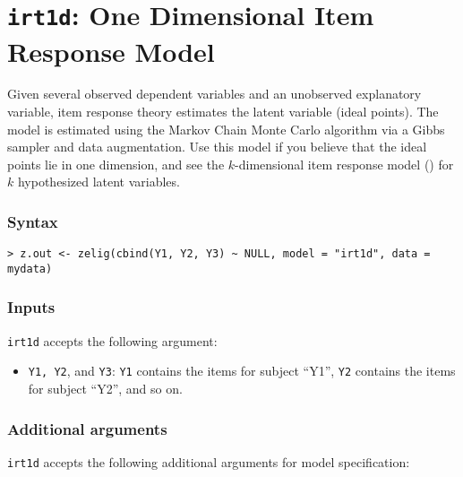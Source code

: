 \section{\texttt{irt1d}: One Dimensional Item Response Model}

\label{irt1d}

Given several observed dependent variables and an unobserved
explanatory variable, item response theory estimates the latent
variable (ideal points).  The model is estimated using the Markov
Chain Monte Carlo algorithm via a Gibbs sampler and data augmentation.
Use this model if you believe that the ideal points lie in one
dimension, and see the $k$-dimensional item response model
() for $k$ hypothesized latent variables.

\subsubsection{Syntax}
\begin{verbatim}
> z.out <- zelig(cbind(Y1, Y2, Y3) ~ NULL, model = "irt1d", data = mydata)
\end{verbatim}

\subsubsection{Inputs}
\texttt{irt1d} accepts the following argument:
\begin{itemize}
\item \texttt{Y1, Y2}, and \texttt{Y3}: \texttt{Y1} contains the items for 
subject ``Y1'', \texttt{Y2} contains the items for subject ``Y2'', and
so on.
\end{itemize}

\subsubsection{Additional arguments}

\texttt{irt1d} accepts the following additional arguments for model specification:

